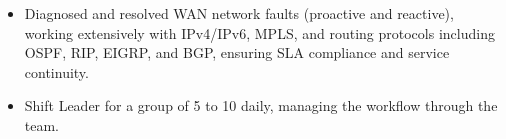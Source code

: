 \vspace{0.4em}
\begin{itemize}[leftmargin=*]
  \item Diagnosed and resolved WAN network faults (proactive and reactive), working extensively with IPv4/IPv6, 
      MPLS, and routing protocols including OSPF, RIP, EIGRP, and BGP, ensuring SLA compliance and service continuity.

\vspace{0.2em}  
  
  \item Shift Leader for a group of 5 to 10 daily, managing the workflow through the team. 
\end{itemize}

\newpage  